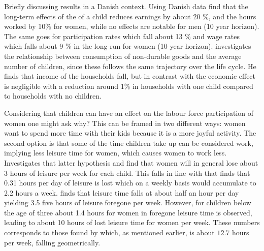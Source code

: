 Briefly discussing results in a Danish context. Using Danish data \textcite{kleven_children_2019} find that the long-term effects of the of a child reduces earnings by about 20 \%, and the hours worked by 10\% for women, while no effects are notable for men (10 year horizon). The same goes for participation rates which fall about 13 \% and wage rates which falls about 9 \% in the long-run for women (10 year horizon). \textcite{jorgensen_life-cycle_2017} investigates the relationship between consumption of non-durable goods and the average number of children, since these follows the same trajectory over the life cycle. He finds that income of the households fall, but in contrast with \textcite{kleven_children_2019} the economic effect is negligible with a reduction around 1\% in households with one child compared to households with no children. 

Considering that children can have an effect on the labour force participation of women one might ask why? This can be framed in two different ways: women want to spend more time with their kids because it is a more joyful activity. The second option is that some of the time children take up can be considered work, implying less leisure time for women, which causes women to work less. \textcite{firestone_estimation_1988} Investigates that latter hypothesis and find that  women will in general lose about 3 hours of leisure per week for each child. This falls in line with \textcite{thrane_men_2000} that finds that 0.31 hours per day of leisure is lost which on a weekly basis would accumulate to 2.2 hours a week. \textcite{ekert-jaffe_time_2015} finds that leisure time falls at about half an hour per day yielding 3.5 five hours of leisure foregone per week. However, for children below the age of three about 1.4 hours for women in foregone leisure time is observed, leading to about 10 hours of lost leisure time for women per week.  These numbers corresponds to those found by \textcite{hotz_empirical_1988} which, as mentioned earlier, is about $12.7$ hours per week, falling geometrically. 
